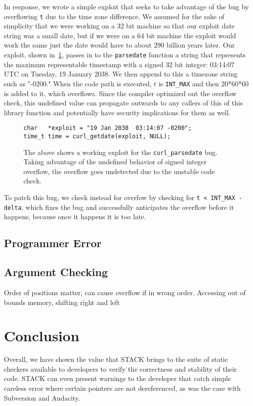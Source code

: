 \documentclass[9pt,twocolumn]{article}
\begin{document}
In response, we wrote a simple exploit that seeks to take advantage of the bug by overflowing \texttt{t} due to the time zone difference. We assumed for the sake of simplicity that we were working on a 32 bit machine so that our exploit date string was a small date, but if we were on a 64 bit machine the exploit would work the same just the date would have to about 290 billion years later. Our exploit, shown in~\ref{fig:curl-xploit}, passes in to the \texttt{parsedate} function a string that represents the maximum representable timestamp with a signed 32 bit integer: 03:14:07 UTC on Tuesday, 19 January 2038. We then append to this a timezone string such as "-0200." When the code path is executed, $t$ is \texttt{INT\_MAX} and then 20*60*60 is added to it, which overflows. Since the compiler optimized out the overflow check, this undefined value can propagate outwards to any callers of this of this library function and potentially have security implications for them as well.

\begin{figure}[h]
\begin{lstlisting}
char   *exploit = "19 Jan 2038  03:14:07 -0200";
time_t time = curl_getdate(exploit, NULL);
\end{lstlisting}
\label{fig:curl-xploit}
\caption{The above shows a working exploit for the \texttt{curl\_parsedate} bug. Taking advantage of the undefined behavior of signed integer overflow, the overflow goes undetected due to the unstable code check. }
\end{figure}

To patch this bug, we check instead for overfow by checking for \texttt{t < INT\_MAX - delta}, which fixes the bug and successfully anticipates the overflow before it happens, because once it happens it is too late.



\subsection{Programmer Error}

\subsection{Argument Checking}

Order of positions matter, can cause overflow if in wrong order. Accessing out of bounds memory, shifting right and left



\section{Conclusion}
\label{sec:conclusion}
Overall, we have shown the value that STACK brings to the suite of static
checkers available to developers to verify the correctness and stability of
their code. STACK can even present warnings to the developer that catch simple
careless error where certain pointers are not dereferenced, as was the case
with Subversion and Audacity.
\end{document}

